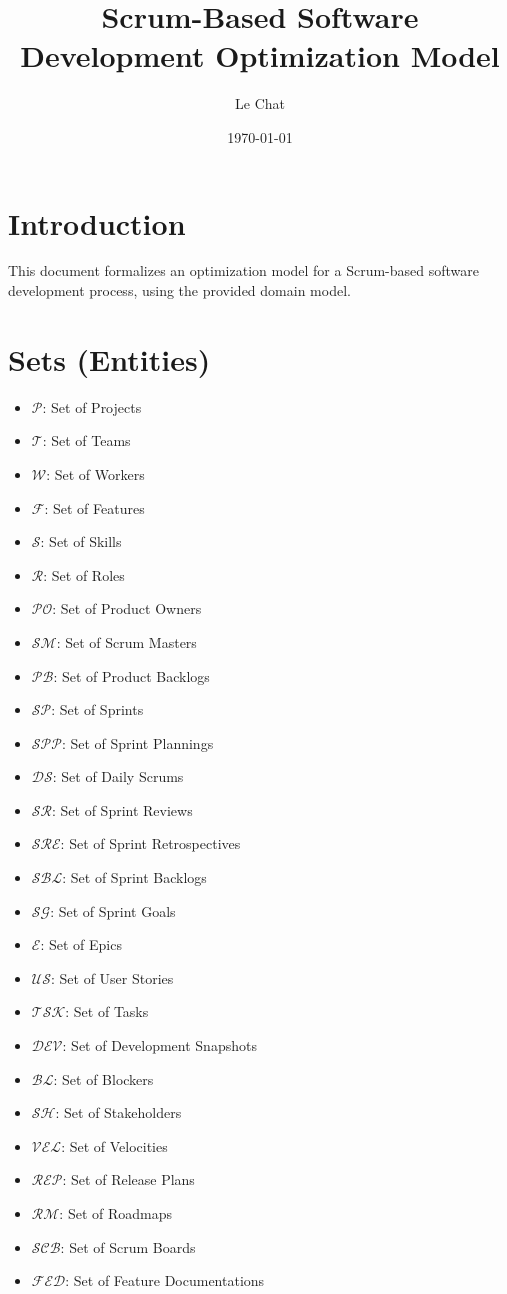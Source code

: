 \documentclass{article}
\title{Scrum-Based Software Development Optimization Model}
\author{Le Chat}
\date{\today}
\begin{document}
\maketitle
\tableofcontents

\section{Introduction}
This document formalizes an optimization model for a Scrum-based software development process, using the provided domain model.

\section{Sets (Entities)}
\begin{itemize}
    \item $\mathcal{P}$: Set of Projects
    \item $\mathcal{T}$: Set of Teams
    \item $\mathcal{W}$: Set of Workers
    \item $\mathcal{F}$: Set of Features
    \item $\mathcal{S}$: Set of Skills
    \item $\mathcal{R}$: Set of Roles
    \item $\mathcal{PO}$: Set of Product Owners
    \item $\mathcal{SM}$: Set of Scrum Masters
    \item $\mathcal{PB}$: Set of Product Backlogs
    \item $\mathcal{SP}$: Set of Sprints
    \item $\mathcal{SPP}$: Set of Sprint Plannings
    \item $\mathcal{DS}$: Set of Daily Scrums
    \item $\mathcal{SR}$: Set of Sprint Reviews
    \item $\mathcal{SRE}$: Set of Sprint Retrospectives
    \item $\mathcal{SBL}$: Set of Sprint Backlogs
    \item $\mathcal{SG}$: Set of Sprint Goals
    \item $\mathcal{E}$: Set of Epics
    \item $\mathcal{US}$: Set of User Stories
    \item $\mathcal{TSK}$: Set of Tasks
    \item $\mathcal{DEV}$: Set of Development Snapshots
    \item $\mathcal{BL}$: Set of Blockers
    \item $\mathcal{SH}$: Set of Stakeholders
    \item $\mathcal{VEL}$: Set of Velocities
    \item $\mathcal{REP}$: Set of Release Plans
    \item $\mathcal{RM}$: Set of Roadmaps
    \item $\mathcal{SCB}$: Set of Scrum Boards
    \item $\mathcal{FED}$: Set of Feature Documentations
\end{itemize}
\end{document}
